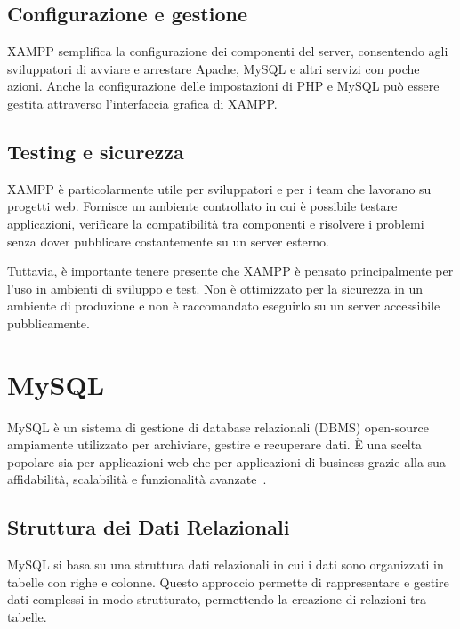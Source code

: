 \subsection{Configurazione e gestione}
XAMPP semplifica la configurazione dei componenti del server, consentendo agli sviluppatori di avviare e arrestare Apache, MySQL e altri servizi con poche azioni. Anche la configurazione delle impostazioni di PHP e MySQL può essere gestita attraverso l'interfaccia grafica di XAMPP.

\subsection{Testing e sicurezza}
XAMPP è particolarmente utile per sviluppatori e per i team che lavorano su progetti web. Fornisce un ambiente controllato in cui è possibile testare applicazioni, verificare la compatibilità tra componenti e risolvere i problemi senza dover pubblicare costantemente su un server esterno.

Tuttavia, è importante tenere presente che XAMPP è pensato principalmente per l'uso in ambienti di sviluppo e test. Non è ottimizzato per la sicurezza in un ambiente di produzione e non è raccomandato eseguirlo su un server accessibile pubblicamente.

\section{MySQL}
MySQL è un sistema di gestione di database relazionali (DBMS) open-source ampiamente utilizzato per archiviare, gestire e recuperare dati. È una scelta popolare sia per applicazioni web che per applicazioni di business grazie alla sua affidabilità, scalabilità e funzionalità avanzate~\cite{XAMPP, ALL_WEB}.

\subsection{Struttura dei Dati Relazionali}
MySQL si basa su una struttura dati relazionali in cui i dati sono organizzati in tabelle con righe e colonne. Questo approccio permette di rappresentare e gestire dati complessi in modo strutturato, permettendo la creazione di relazioni tra tabelle.

